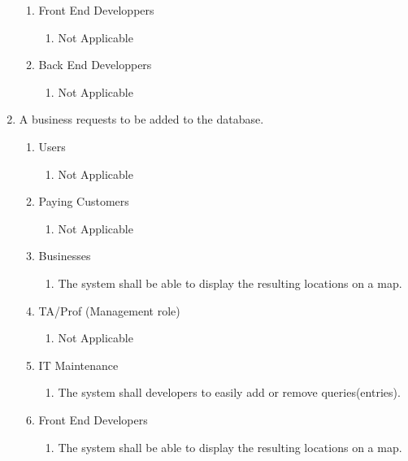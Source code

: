 \documentclass[titlepage]{article}
\begin{document}
\begin{enumerate}[\textbf{{BE}1.}]
\begin{enumerate}[\textbf{{VP1}.1}]
				\item Front End Developpers
				\begin{enumerate}
					\item Not Applicable
				\end{enumerate}
				
				\item Back End Developpers
				\begin{enumerate}
					\item Not Applicable
				\end{enumerate}
			\end{enumerate}
			
			\item A business requests to be added to the database.
			\begin{enumerate}[\textbf{{VP2}.1}]
				
				\item Users
				\begin{enumerate}
					\item Not Applicable 
				\end{enumerate}
				
				\item Paying Customers
				\begin{enumerate}
					\item Not Applicable
				\end{enumerate}
				
				\item Businesses
				\begin{enumerate}
					\item The system shall be able to display the resulting locations on a map.
				\end{enumerate}
				
				\item TA/Prof (Management role)
				\begin{enumerate}
					\item Not Applicable
				\end{enumerate}
				
				\item IT Maintenance
				\begin{enumerate}
					\item The system shall developers to easily add or remove queries(entries).
				\end{enumerate}
				
				\item Front End Developers
				\begin{enumerate}
					\item The system shall be able to display the resulting locations on a map.				\end{enumerate}
				

\end{enumerate}
\end{enumerate}
\end{document}
